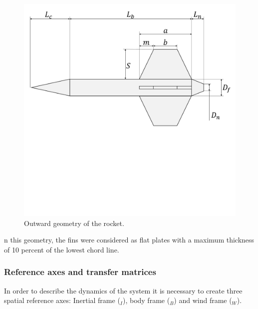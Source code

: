 \documentclass[10pt,fleqn,a4paper,twoside]{article}
\begin{document}
\begin{figure}[h!]
	\centering
	\includegraphics[trim = {0cm 13cm 0cm 0cm}, clip , angle=0, scale=0.15]{imagens/foguete_statera}
	\caption{Outward geometry of the rocket.}
	\label{geometria_foguete}
\end{figure}
n this geometry, the fins were considered as flat plates with a maximum thickness of 10 percent of the lowest chord line.



\subsubsection{Reference axes and transfer matrices}

In order to describe the dynamics of the system it is necessary to create three spatial reference axes: Inertial frame ($ _{I} $), body frame ($ _{B} $) and wind frame ($ _{W} $).

\end{document}
